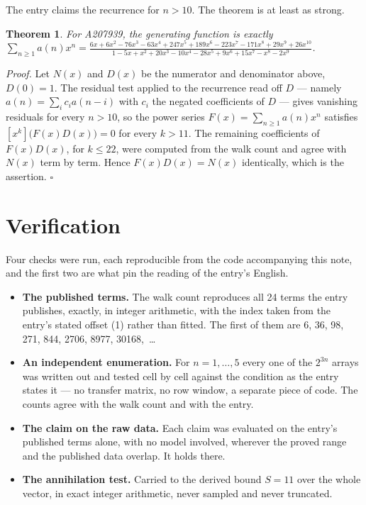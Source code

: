\documentclass[11pt]{article}
\newtheorem{theorem}{Theorem}
\theoremstyle{definition}
\begin{document}
The entry claims the recurrence for $n > 10$. The theorem is at least as strong.

\begin{theorem} For A207939, the generating function is exactly $\sum_{n\ge 1} a(n)x^n = \frac{6x + 6x^{2} - 76x^{3} - 63x^{4} + 247x^{5} + 189x^{6} - 223x^{7} - 171x^{8} + 29x^{9} + 26x^{10}}{1 - 5x + x^{2} + 20x^{3} - 10x^{4} - 28x^{5} + 9x^{6} + 15x^{7} - x^{8} - 2x^{9}}$.\end{theorem}

{\itshape Proof.} Let $N(x)$ and $D(x)$ be the numerator and denominator above, $D(0)=1$. The residual test applied to the recurrence read off $D$ --- namely $a(n) = \sum_i c_i a(n-i)$ with $c_i$ the negated coefficients of $D$ --- gives vanishing residuals for every $n > 10$, so the power series $F(x)=\sum_{n\ge 1}a(n)x^n$ satisfies $[x^k]\bigl(F(x)D(x)\bigr) = 0$ for every $k > 11$. The remaining coefficients of $F(x)D(x)$, for $k \le 22$, were computed from the walk count and agree with $N(x)$ term by term. Hence $F(x)D(x) = N(x)$ identically, which is the assertion. $\square$

\section{Verification}

Four checks were run, each reproducible from the code accompanying this note, and the first two are what pin the reading of the entry's English.

\begin{itemize}

\item {\bfseries The published terms.} The walk count reproduces all 24 terms the entry publishes, exactly, in integer arithmetic, with the index taken from the entry's stated offset (1) rather than fitted. The first of them are 6, 36, 98, 271, 844, 2706, 8977, 30168,~\dots

\item {\bfseries An independent enumeration.} For $n = 1,\dots,5$ every one of the $2^{3n}$ arrays was written out and tested cell by cell against the condition as the entry states it --- no transfer matrix, no row window, a separate piece of code. The counts agree with the walk count and with the entry.

\item {\bfseries The claim on the raw data.} Each claim was evaluated on the entry's published terms alone, with no model involved, wherever the proved range and the published data overlap. It holds there.

\item {\bfseries The annihilation test.} Carried to the derived bound $S = 11$ over the whole vector, in exact integer arithmetic, never sampled and never truncated.

\end{itemize}
\end{document}
